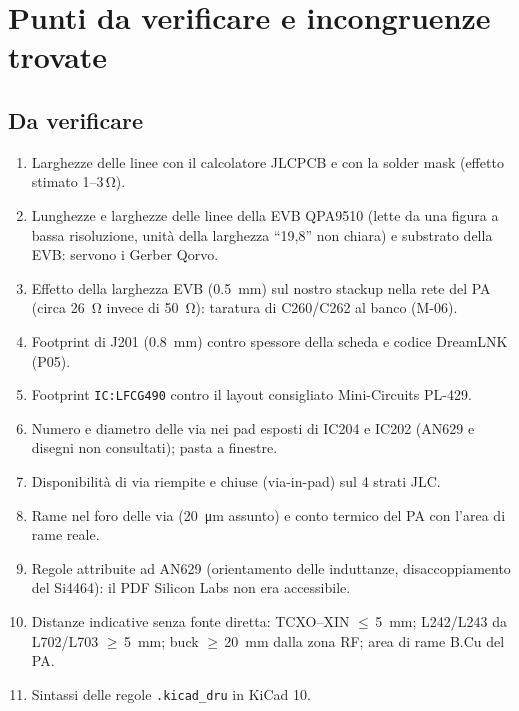 \documentclass[a4paper,10pt]{article}
\begin{document}
\section{Punti da verificare e incongruenze trovate}
\label{app:verifiche}

\subsection{Da verificare}
\begin{enumerate}
\item Larghezze delle linee con il calcolatore JLCPCB e con la solder mask (effetto stimato 1--3\,\si{\ohm}).
\item Lunghezze e larghezze delle linee della EVB QPA9510 (lette da una figura a bassa risoluzione, unità
      della larghezza \enquote{19,8} non chiara) e substrato della EVB: servono i Gerber Qorvo.
\item Effetto della larghezza EVB (\SI{0.5}{mm}) sul nostro stackup nella rete del PA (circa \SI{26}{\ohm}
      invece di \SI{50}{\ohm}): taratura di C260/C262 al banco (M-06).
\item Footprint di J201 (\SI{0.8}{mm}) contro spessore della scheda e codice DreamLNK (P05).
\item Footprint \texttt{IC:LFCG490} contro il layout consigliato Mini-Circuits PL-429.
\item Numero e diametro delle via nei pad esposti di IC204 e IC202 (AN629 e disegni non consultati); pasta a finestre.
\item Disponibilità di via riempite e chiuse (via-in-pad) sul 4 strati JLC.
\item Rame nel foro delle via (\SI{20}{\micro m} assunto) e conto termico del PA con l'area di rame reale.
\item Regole attribuite ad AN629 (orientamento delle induttanze, disaccoppiamento del Si4464): il PDF
      Silicon Labs non era accessibile.
\item Distanze indicative senza fonte diretta: TCXO--XIN $\le$\,\SI{5}{mm}; L242/L243 da L702/L703
      $\ge$\,\SI{5}{mm}; buck $\ge$\,\SI{20}{mm} dalla zona RF; area di rame B.Cu del PA.
\item Sintassi delle regole \texttt{.kicad\_dru} in KiCad 10.
\end{enumerate}
\end{document}
